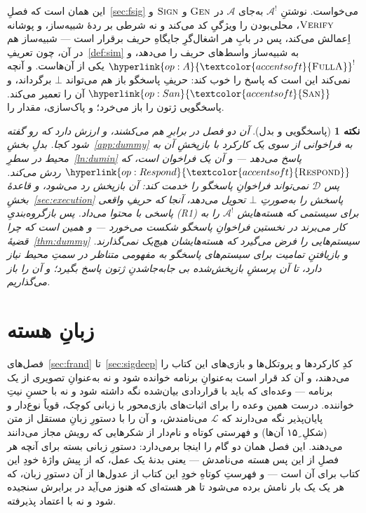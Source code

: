 \documentclass[10pt,oneside,openany]{book}
\newcommand{\Adv}{\mathcal{A}}
\newcommand{\Dum}{\mathcal{D}}
\newcommand{\op}[1]{\textnormal{\textsc{#1}}}
\newcommand{\opl}[1]{\hyperlink{op:#1}{\textcolor{accentsoft}{\op{#1}}}}
\newcommand{\fopl}[1]{\hyperlink{op:#1}{\textcolor{accentsoft}{\op{Full}\op{#1}}}}
\newcommand{\none}{\bot}
\newcommand{\San}{\opl{San}}
\theoremstyle{accentdef}
\newtheorem{remark}[definition]{نکته}
\theoremstyle{accentplain}
\begin{document}
این همان است که فصلِ~\ref{sec:fsig} می‌خواست. نوشتنِ $\Adv^{!}$ به‌جای
$\Adv$ در $\op{Gen}$ و $\op{Sign}$ و $\op{Verify}$، محلی‌بودن را ویژگیِ کد
می‌کند و نه شرطی بر ردهٔ شبیه‌ساز، و پوشانه اِعمالش می‌کند، پس در بابِ
\emph{هر} اشغال‌گرِ جایگاهِ حریف برقرار است --- شبیه‌ساز هم در آن، چون
تعریفِ~\ref{def:sim} به شبیه‌ساز واسط‌های حریف را می‌دهد، و
$\fopl{A}^{!}$ یکی از آن‌هاست. و آنچه نمی‌کند این است که پاسخ را خوب کند:
حریفِ پاسخگو باز هم می‌تواند $\none$ برگرداند، و $\San$ آن را تعمیر
می‌کند. پاسخگویی ژتون را باز می‌خرد؛ و پاک‌سازی، مقدار را.

\begin{remark}[پاسخگویی و بدل]\label{rem:respdummy}
آن دو فصل در برابرِ هم می‌کشند، و ارزش دارد که رو گفته شود کجا. بدلِ
بخشِ~\ref{app:dummy} به فراخوانی از سوی یک کارکرد با بازپخشِ آن به محیط در
سطرِ~\ref{ln:dumin} پاسخ می‌دهد --- و آن یک فراخوان است، که
$\opl{Respond}$ ردش می‌کند. پس $\Dum$ نمی‌تواند فراخوانِ پاسخگو را خدمت
کند: آن بازپخش رد می‌شود، و قاعدهٔ بخشِ~\ref{sec:execution} پاسخش را
به‌صورتِ $\none$ تحویل می‌دهد، آنجا که حریفِ واقعی پاسخی با محتوا می‌داد. پس
بازگروه‌بندیِ (R1) برای سیستمی که هسته‌هایش $\Adv^{!}$ را به کار می‌برند در
نخستین فراخوانِ پاسخگو شکست می‌خورد --- و همین است که چرا
قضیهٔ~\ref{thm:dummy} سیستم‌هایی را فرض می‌گیرد که هسته‌هایشان هیچ‌یک
نمی‌گذارند. و بازیافتنِ تمامیت برای سیستم‌های پاسخگو به مفهومی متناظر در سمتِ
محیط نیاز دارد، تا آن پرسشِ بازپخش‌شده بی جابه‌جا‌شدنِ ژتون پاسخ بگیرد؛ و
آن را باز می‌گذاریم.
\end{remark}

\chapter{زبانِ هسته}\label{app:codelang}

فصل‌های~\ref{sec:frand} تا~\ref{sec:sigdeep} کدِ کارکردها و پروتکل‌ها و
بازی‌های این کتاب را می‌دهند، و آن کد قرار است به‌عنوانِ برنامه خوانده شود و
نه به‌عنوانِ تصویری از یک برنامه --- وعده‌ای که باید با قراردادی بیان‌شده
نگه داشته شود و نه با حسنِ نیتِ خواننده. \cite{BR06} درست همین وعده را برای
اثبات‌های بازی‌محور با زبانی کوچک، قویاً نوع‌دار و پایان‌پذیر نگه می‌دارند
که $\mathcal{L}$ می‌نامندش، و آن را با دستورِ زبانِ مستقل از متن (شکلِ~۱۵ِ
آن‌ها) و فهرستی کوتاه و نام‌دار از شکرهایی که رویش مجاز می‌دانند می‌دهند.
این فصل همان دو گام را اینجا برمی‌دارد: دستورِ زبانی بسته برای آنچه هر فصلِ
از این پس \emph{هسته} می‌نامدش --- یعنی بدنهٔ یک عمل، که از پیش واژهٔ خودِ این
کتاب برای آن است --- و فهرستِ کوتاهِ خودِ این کتاب از عدول‌ها از آن دستورِ
زبان، که هر یک یک بار نامش برده می‌شود تا هر هسته‌ای که هنوز می‌آید در
برابرش سنجیده شود و نه با اعتماد پذیرفته.
\end{document}
